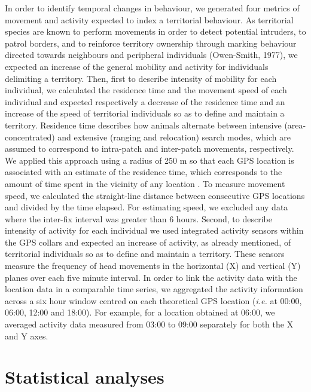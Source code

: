 \documentclass[a4paper,11pt]{article}
\begin{document}
In order to identify temporal changes in behaviour, we generated four
metrics of movement and activity expected to index a territorial
behaviour. As territorial species are known to perform movements in
order to detect potential intruders, to patrol borders, and to
reinforce territory ownership through marking behaviour directed
towards neighbours and peripheral individuals (Owen-Smith, 1977), we
expected an increase of the general mobility and activity for
individuals delimiting a territory. Then, first to describe intensity
of mobility for each individual, we calculated the residence time
\citep{barraquand_animal_2008} and the movement speed of each
individual and expected respectively a decrease of the residence time
and an increase of the speed of territorial individuals so as to
define and maintain a territory. Residence time describes how animals
alternate between intensive (area-concentrated) and extensive (ranging
and relocation) search modes, which are assumed to correspond to
intra-patch and inter-patch movements, respectively. We applied this
approach using a radius of 250 m so that each GPS location is
associated with an estimate of the residence time, which corresponds
to the amount of time spent in the vicinity of any location
\citep{barraquand_animal_2008}. To measure movement speed, we
calculated the straight-line distance between consecutive GPS
locations and divided by the time elapsed. For estimating speed, we
excluded any data where the inter-fix interval was greater than 6
hours. Second, to describe intensity of activity for each individual
we used integrated activity sensors within the GPS collars and
expected an increase of activity, as already mentioned, of territorial
individuals so as to define and maintain a territory. These sensors
measure the frequency of head movements in the horizontal (X) and
vertical (Y) planes over each five minute interval. In order to link
the activity data with the location data in a comparable time series,
we aggregated the activity information across a six hour window
centred on each theoretical GPS location (\textit{i.e.} at 00:00,
06:00, 12:00 and 18:00). For example, for a location obtained at
06:00, we averaged activity data measured from 03:00 to 09:00
separately for both the X and Y axes.

\section*{Statistical analyses}
\end{document}
